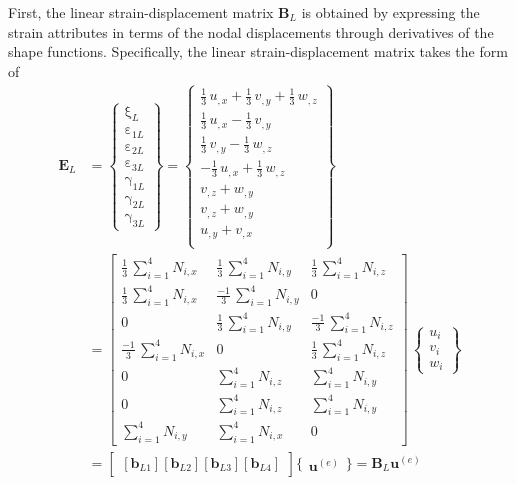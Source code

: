First, the linear strain-displacement matrix $\mathbf{B}_L$ is obtained by expressing the strain attributes in terms of the nodal displacements through derivatives of the shape functions. Specifically, the linear strain-displacement matrix takes the form of
\begin{equation}
\begin{aligned}
\mathbf{E}_L & =  \begin{Bmatrix}
\mathrm \xi_{L} \\
\mathrm \varepsilon_{1L} \\
\mathrm \varepsilon_{2L} \\
\mathrm \varepsilon_{3L} \\
\mathrm \gamma_{1L} \\
\mathrm \gamma_{2L} \\
\mathrm \gamma_{3L}\end{Bmatrix} = 
\begin{Bmatrix}
\tfrac{1}{3} \, u_{,x} + \tfrac{1}{3} \, v_{,y} + \tfrac{1}{3} \, w_{,z} \\
\tfrac{1}{3} \, u_{,x} - \tfrac{1}{3} \, v_{,y} \\
\tfrac{1}{3} \, v_{,y} - \tfrac{1}{3} \, w_{,z} \\
- \tfrac{1}{3} \, u_{,x} + \tfrac{1}{3} \, w_{,z} \\ 
v_{,z} +  w_{,y} \\ 
v_{,z} +  w_{,y} \\ 
u_{,y} +  v_{,x} \\\end{Bmatrix} \\
& = \begin{bmatrix}
\tfrac{1}{3} \, \sum\nolimits_{i=1}^4 N_{i,x}  & \tfrac{1}{3} \, \sum\nolimits_{i=1}^4 N_{i,y} & \tfrac{1}{3} \, \sum\nolimits_{i=1}^4 N_{i,z} \\
\tfrac{1}{3} \, \sum\nolimits_{i=1}^4 N_{i,x}  & \tfrac{-1}{3} \, \sum\nolimits_{i=1}^4 N_{i,y} & 0 \\ 0 & \tfrac{1}{3} \, \sum\nolimits_{i=1}^4 N_{i,y}  &  \tfrac{-1}{3} \, \sum\nolimits_{i=1}^4 N_{i,z} \\  \tfrac{-1}{3} \, \sum\nolimits_{i=1}^4 N_{i,x}  & 0 & \tfrac{1}{3} \, \sum\nolimits_{i=1}^4 N_{i,z} \\ 0 & \sum\nolimits_{i=1}^4 N_{i,z}  &  \sum\nolimits_{i=1}^4 N_{i,y} \\ 0 & \sum\nolimits_{i=1}^4 N_{i,z}  &  \sum\nolimits_{i=1}^4 N_{i,y} \\ \sum\nolimits_{i=1}^4 N_{i,y}  &  \sum\nolimits_{i=1}^4 N_{i,x} & 0 \end{bmatrix} \, \begin{Bmatrix}
u_{i} \\
v_{i} \\
w_{i} \end{Bmatrix} \\
& = \begin{bmatrix}
[\mathbf{b}_{L1}] [\mathbf{b}_{L2}] [\mathbf{b}_{L3}] [\mathbf{b}_{L4}]
\end{bmatrix} \bigl\{ \begin{matrix} \mathbf{u}^{(e)} \end{matrix} \bigr\} 
= \mathbf{B}_L  \mathbf{u}^{(e)}  
\end{aligned}
\end{equation}
